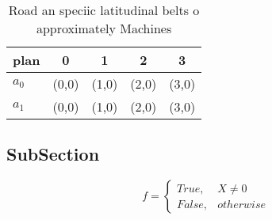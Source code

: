 \documentclass[a4paper]{article}
\begin{document}
\begin{table}
\begin{adjustbox}{width=0.5\columnwidth}
\begin{tabular}{|l|l|l|l|l|}
\hline
\textbf{plan} & \multicolumn{1}{c|}{\textbf{0}} & \multicolumn{1}{c|}{\textbf{1}} & \multicolumn{1}{c|}{\textbf{2}} & \multicolumn{1}{c|}{\textbf{3}} \\ \hline
\textbf{$a_0$}  & (0,0) & (1,0) & (2,0) & (3,0) \\ \hline
\textbf{$a_1$}  & (0,0) & (1,0) & (2,0) & (3,0) \\ \hline
\end{tabular}
\end{adjustbox}
\caption{Road an speciic latitudinal belts o approximately Machines 
}
\end{table}

\subsection{SubSection}

\begin{equation}   f =
\begin{cases} True, & X \neq 0\\
False, & otherwise
\end{cases}
\end{equation}
\end{document}
